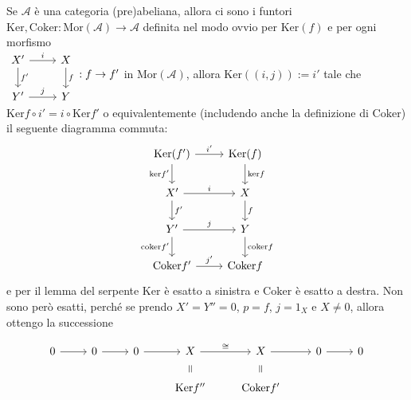\begin{remark}{}
    Se \(\mathcal{A}\) è una categoria (pre)abeliana, allora ci sono i funtori
    \(\mathrm{Ker}, \mathrm{Coker} : \mathrm{Mor}{(\mathcal{A})} \to \mathcal{A}\) definita nel
    modo ovvio per \(\mathrm{Ker}{(f)}\) e per ogni morfismo \\\(\begin{tikzcd}
	{X'} & X \\
	{Y'} & Y
	\arrow["i", from=1-1, to=1-2]
	\arrow["{f'}", from=1-1, to=2-1]
	\arrow["f", from=1-2, to=2-2]
	\arrow["{j}", from=2-1, to=2-2]
\end{tikzcd} : f \to f'\) in \(\mathrm{Mor}{(\mathcal{A})}\), allora \(\mathrm{Ker}{({(i, j)})} := i'\) tale che \(\mathrm{Ker}f \circ i' = i \circ \mathrm{Ker}f'\) o equivalentemente (includendo anche la definizione di \(\mathrm{Coker}\)) il seguente diagramma commuta:
\[ \begin{tikzcd}
	{\mathrm{Ker}(f')} & {\mathrm{Ker}(f)} \\
	{X'} & X \\
	{Y'} & Y \\
	{\mathrm{Coker}f'} & {\mathrm{Coker}f}
	\arrow["{i'}", from=1-1, to=1-2]
	\arrow["{\mathrm{ker}f'}"', from=1-1, to=2-1]
	\arrow["{\mathrm{ker}f}", from=1-2, to=2-2]
	\arrow["i", from=2-1, to=2-2]
	\arrow["{f'}", from=2-1, to=3-1]
	\arrow["f", from=2-2, to=3-2]
	\arrow["j", from=3-1, to=3-2]
	\arrow["{\mathrm{coker}f'}"', from=3-1, to=4-1]
	\arrow["{\mathrm{coker}f}", from=3-2, to=4-2]
	\arrow["{j'}", from=4-1, to=4-2]
\end{tikzcd} \]
    e per il lemma del serpente \(\mathrm{Ker}\) è esatto a sinistra e \(\mathrm{Coker}\) è esatto a destra.
    Non sono però esatti, perché se prendo \(X' = Y'' = 0\), \(p = f\), \(j =
    1_X\) e \(X \neq 0\), allora ottengo la successione

\[ \begin{tikzcd}
	0 & 0 & 0 & X & X & 0 & 0 \\
	&&& {\mathrm{Ker}f''} & {\mathrm{Coker}f'}
	\arrow[from=1-1, to=1-2]
	\arrow[from=1-2, to=1-3]
	\arrow[from=1-3, to=1-4]
	\arrow[from=1-6, to=1-7]
	\arrow["\cong", from=1-4, to=1-5]
	\arrow[from=1-5, to=1-6]
	\arrow["{=}"{marking, allow upside down}, draw=none, from=2-4, to=1-4]
	\arrow["{=}"{marking, allow upside down}, draw=none, from=2-5, to=1-5]
\end{tikzcd} \]

\end{remark}

